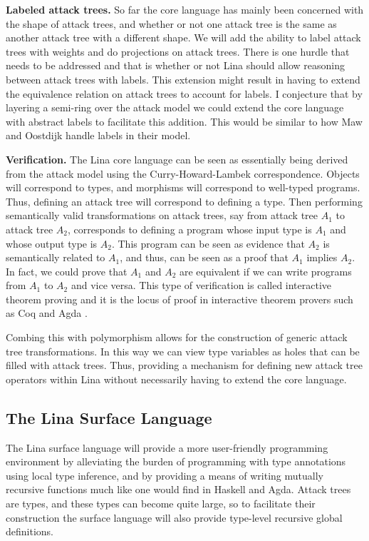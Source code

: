 \begin{full}
\textbf{Labeled attack trees.}  So far the core language has mainly
been concerned with the shape of attack trees, and whether or not one
attack tree is the same as another attack tree with a different shape.
We will add the ability to label attack trees with weights and do
projections on attack trees.  There is one hurdle that needs to be
addressed and that is whether or not Lina should allow reasoning
between attack trees with labels.  This extension might result in
having to extend the equivalence relation on attack trees to account
for labels.  I conjecture that by layering a semi-ring over the attack
model we could extend the core language with abstract labels to
facilitate this addition.  This would be similar to how Maw and
Oostdijk \cite{Mauw:2006} handle labels in their model.

\textbf{Verification.} The Lina core language can be seen as
essentially being derived from the attack model using the
Curry-Howard-Lambek correspondence.  Objects will correspond to types,
and morphisms will correspond to well-typed programs.  Thus, defining
an attack tree will correspond to defining a type.  Then performing
semantically valid transformations on attack trees, say from attack
tree $A_1$ to attack tree $A_2$, corresponds to defining a program
whose input type is $A_1$ and whose output type is $A_2$.  This
program can be seen as evidence that $A_2$ is semantically related to
$A_1$, and thus, can be seen as a proof that $A_1$ implies $A_2$.  In
fact, we could prove that $A_1$ and $A_2$ are equivalent if we can
write programs from $A_1$ to $A_2$ and vice versa.  This type of
verification is called interactive theorem proving and it is the locus
of proof in interactive theorem provers such as Coq
\cite{CoqRefMan:2008} and Agda \cite{Norell:2009}.

Combing this with polymorphism allows for the construction of generic
attack tree transformations.  In this way we can view type variables
as holes that can be filled with attack trees.  Thus, providing a
mechanism for defining new attack tree operators within Lina without
necessarily having to extend the core language.

\subsection{The Lina Surface Language}
\label{subsec:surface_language}

The Lina surface language will provide a more user-friendly
programming environment by alleviating the burden of programming with
type annotations using local type inference, and by providing a means
of writing mutually recursive functions much like one would find in
Haskell and Agda.  Attack trees are types, and these types can become
quite large, so to facilitate their construction the surface language
will also provide type-level recursive global definitions.


\end{full}
